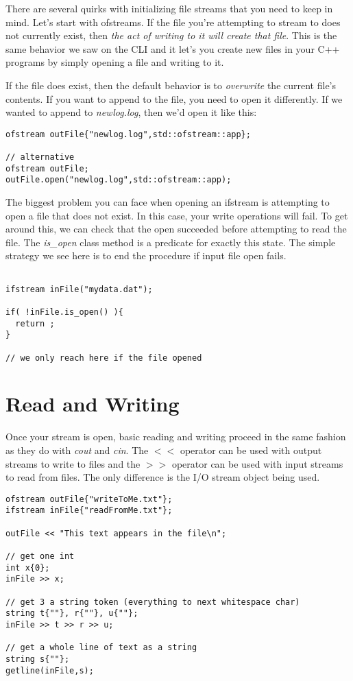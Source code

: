 \documentclass[nobib]{tufte-handout}
\begin{document}
There are several quirks with initializing file streams that you need to keep in mind.  Let's start with ofstreams.  If the file you're attempting to stream to does not currently exist, then \textit{the act of writing to it will create that file}.  This is the same behavior we saw on the CLI and it let's you create new files in your C++ programs by simply opening a file and writing to it. 

If the file does exist, then the default behavior is to \textit{overwrite} the current file's contents.  If you want to append to the file, you need to open it differently. If we wanted to append to \textit{newlog.log}, then we'd open it like this:
\begin{verbatim}
ofstream outFile{"newlog.log",std::ofstream::app}; 

// alternative 
ofstream outFile;
outFile.open("newlog.log",std::ofstream::app);
\end{verbatim}

The biggest problem you can face when opening an ifstream is attempting to open a file that does not exist.  In this case, your write operations will fail. To get around this, we can check that the open succeeded before attempting to read the file. The \textit{is\_open} class method is a predicate for exactly this state.  The simple strategy we see here is to end the procedure if input file open fails.
\begin{verbatim}

ifstream inFile("mydata.dat");

if( !inFile.is_open() ){
  return ; 
}

// we only reach here if the file opened
\end{verbatim}


\section{Read and Writing}

Once your stream is open, basic reading and writing proceed in the same fashion as they do with \textit{cout} and \textit{cin}.  The $<<$ operator can be used with output streams to write to files and the $>>$ operator can be used with input streams to read from files. The only difference is the I/O stream object being used.
\begin{verbatim}
ofstream outFile{"writeToMe.txt"};
ifstream inFile{"readFromMe.txt"};

outFile << "This text appears in the file\n";

// get one int
int x{0};
inFile >> x;

// get 3 a string token (everything to next whitespace char)
string t{""}, r{""}, u{""};
inFile >> t >> r >> u;

// get a whole line of text as a string
string s{""};
getline(inFile,s);
\end{verbatim}
\end{document}
